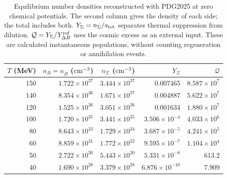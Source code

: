 \begin{table}[t]\centering\small
\caption{Equilibrium number densities reconstructed with PDG2025 at zero chemical potentials. The second column gives the density of each side; the total includes both. $Y_\Sigma=n_\Sigma/s_{\rm tot}$ separates thermal suppression from dilution. $\mathcal Q=Y_\Sigma/Y_{\Delta B}^{\rm ref}$ uses the cosmic excess as an external input. These are calculated instantaneous populations, without counting regeneration or annihilation events.}\label{tab:populations}
\setlength{\tabcolsep}{12pt}\renewcommand{\arraystretch}{1.14}
\begin{tabular}{rrrrr}\toprule
$T$ (MeV) & $n_B=n_{\bar B}$ (${\rm cm^{-3}}$) & $n_\Sigma$ (${\rm cm^{-3}}$) & $Y_\Sigma$ & $\mathcal Q$ \\ \midrule
150 & $1.722\times10^{37}$ & $3.444\times10^{37}$ & 0.007465 & $8.587\times10^{7}$ \\
140 & $8.354\times10^{36}$ & $1.671\times10^{37}$ & 0.004887 & $5.622\times10^{7}$ \\
120 & $1.525\times10^{36}$ & $3.051\times10^{36}$ & 0.001634 & $1.880\times10^{7}$ \\
100 & $1.720\times10^{35}$ & $3.441\times10^{35}$ & $3.506\times10^{-4}$ & $4.033\times10^{6}$ \\
80 & $8.643\times10^{33}$ & $1.729\times10^{34}$ & $3.687\times10^{-5}$ & $4.241\times10^{5}$ \\
60 & $8.859\times10^{31}$ & $1.772\times10^{32}$ & $9.595\times10^{-7}$ & $1.104\times10^{4}$ \\
50 & $2.722\times10^{30}$ & $5.443\times10^{30}$ & $5.331\times10^{-8}$ & 613.2 \\
40 & $1.690\times10^{28}$ & $3.379\times10^{28}$ & $6.876\times10^{-10}$ & 7.909 \\
\bottomrule\end{tabular}\end{table}
